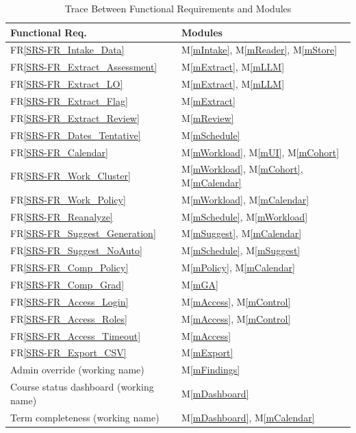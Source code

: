 \documentclass[12pt, titlepage]{article}
\newcommand{\mref}[1]{M\ref{#1}}
\newcommand{\frref}[1]{FR\ref{SRS-#1}}
\begin{document}
\begin{table}[H]
\centering
\begin{tabular}{p{} p{}}
\toprule
\textbf{Functional Req.} & \textbf{Modules}\\
\midrule
\frref{FR_Intake_Data} & \mref{mIntake}, \mref{mReader}, \mref{mStore}\\
\frref{FR_Extract_Assessment} & \mref{mExtract}, \mref{mLLM}\\
\frref{FR_Extract_LO} & \mref{mExtract}, \mref{mLLM}\\
\frref{FR_Extract_Flag} & \mref{mExtract}\\
\frref{FR_Extract_Review} & \mref{mReview}\\
\frref{FR_Dates_Tentative} & \mref{mSchedule}\\
\frref{FR_Calendar} & \mref{mWorkload}, \mref{mUI}, \mref{mCohort}\\
\frref{FR_Work_Cluster} & \mref{mWorkload}, \mref{mCohort}, \mref{mCalendar}\\
\frref{FR_Work_Policy} & \mref{mWorkload}, \mref{mCalendar}\\
\frref{FR_Reanalyze} & \mref{mSchedule}, \mref{mWorkload}\\
\frref{FR_Suggest_Generation} & \mref{mSuggest}, \mref{mCalendar}\\
\frref{FR_Suggest_NoAuto} & \mref{mSchedule}, \mref{mSuggest}\\
\frref{FR_Comp_Policy} & \mref{mPolicy}, \mref{mCalendar}\\
\frref{FR_Comp_Grad} & \mref{mGA}\\
\frref{FR_Access_Login} & \mref{mAccess}, \mref{mControl}\\
\frref{FR_Access_Roles} & \mref{mAccess}, \mref{mControl}\\
\frref{FR_Access_Timeout} & \mref{mAccess}\\
\frref{FR_Export_CSV} & \mref{mExport}\\
Admin override (working name) & \mref{mFindings}\\
Course status dashboard (working name) & \mref{mDashboard}\\
Term completeness (working name) & \mref{mDashboard}, \mref{mCalendar}\\
\bottomrule
\end{tabular}
\caption{Trace Between Functional Requirements and Modules}
\label{TblRT}
\end{table}
\end{document}
